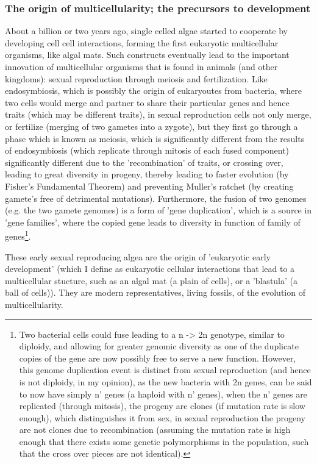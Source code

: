 \subsubsection{The origin of multicellularity; the precursors to development}
About a billion or two years ago, single celled algae started to cooperate by developing cell cell interactions, forming the first eukaryotic multicellular  organisms, like algal mats.  Such constructs eventually lead to the important innovation of multicellular organisms that is found in animals (and other kingdoms): sexual reproduction through meiosis and fertilization.  Like endosymbiosis, which is possibly the origin of eukaryoutes from bacteria, where two cells would merge and partner to share their particular genes and hence traits (which may be different traits), in sexual reproduction cells not only merge, or fertilize (merging of two gametes into a zygote), but they first go through a phase which is known as meiosis, which is significantly different from the results of endosymbiosis (which replicate through mitosis of each fused component) significantly different due to the 'recombination' of traits, or crossing over, leading to great diversity in progeny, thereby leading to faster evolution (by Fisher's Fundamental Theorem) and preventing Muller's ratchet (by creating gamete's free of detrimental mutations).  Furthermore, the fusion of two genomes (e.g. the two gamete genomes) is a form of 'gene duplication', which is a source in 'gene families', where the copied gene leads to diversity in function of family of genes\footnote{Two bacterial cells could fuse leading to a n -> 2n genotype, similar to diploidy, and allowing for greater genomic diversity as one of the duplicate copies of the gene are now possibly free to serve a new function.  However, this genome duplication event is distinct from sexual reproduction (and hence is not diploidy, in my opinion), as the new bacteria with 2n genes, can be said to now have simply n' genes (a haploid with n' genes), when the n' genes are replicated (through mitosis), the progeny are clones (if mutation rate is slow enough), which distinguishes it from sex, in sexual reproduction the progeny are not clones due to recombination (assuming the mutation rate is high enough that there exists some genetic polymorphisms in the population, such that the cross over pieces are not identical).}.  

These early sexual reproducing algea are the origin of 'eukaryotic early development' (which I define as eukaryotic cellular interactions that lead to a multicellular stucture, such as an algal mat (a plain of cells), or a 'blastula' (a ball of cells)\cite{pmid7579526}).  They are modern representatives, living fossils, of the evolution of multicellularity.  

